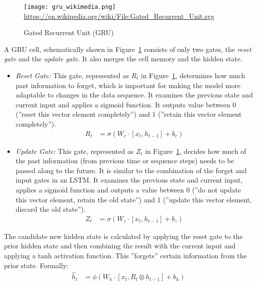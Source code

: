 \begin{figure}
\centering

\texttt{[image: gru\_wikimedia.png]}
\scriptsize \url{https://en.wikipedia.org/wiki/File:Gated_Recurrent_Unit.svg} \normalsize
\caption{Gated Recurrent Unit (GRU)}
\label{fig:gru}
\end{figure}

A GRU cell, schematically shown in Figure~\ref{fig:gru} consists of only two gates, the \emph{reset gate} and the \emph{update gate}. It also merges the cell memory and the hidden state.

\begin{itemize}
\item \emph{Reset Gate:} This gate, represented as $R_t$ in Figure~\ref{fig:gru}, determines how much past information to forget, which is important for making the model more adaptable to changes in the data sequence. It examines the previous state and current input and applies a sigmoid function. It outputs  value between 0 (''reset this vector element completely'') and 1 (''retain this vector element completely'').
\begin{align}
R_t &= \sigma (W_r \cdot [x_t, h_{t-1}] + b_r) \label{eq:reset}
\end{align}
\item \emph{Update Gate:} This gate, represented as $Z_t$ in Figure~\ref{fig:gru}, decides how much of the past information (from previous time or sequence steps) needs to be passed along to the future. It is similar to the combination of the forget and input gates in an LSTM. It examines the previous state and current input, applies a sigmoid function and outputs a value between 0 (''do not update this vector element, retain the old state'') and 1 (''update this vector element, discard the old state''). 
\begin{align}
Z_t &= \sigma (W_z \cdot [x_t, h_{t-1}] + b_z) \label{eq:update}
\end{align}
\end{itemize}

The candidate new hidden state is calculated by applying the reset gate to the prior hidden state and then combining the result with the current input and applying a tanh activation function. This ''forgets'' certain information from the prior state. Formally:
\begin{align}
\hat{h}_t &= \phi (W_h \cdot [x_t, R_t \otimes h_{t-1}] + b_h) \label{eq:candidategru}
\end{align}

